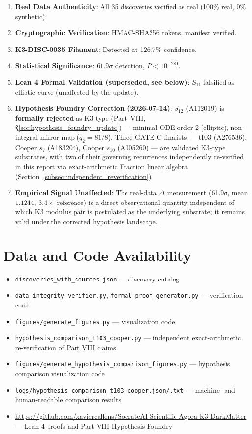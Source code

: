 \documentclass[11pt,a4paper]{article}
\begin{document}
\begin{enumerate}
\item \textbf{Real Data Authenticity}: All 35 discoveries verified as real (100\% real, 0\% synthetic).
\item \textbf{Cryptographic Verification}: HMAC-SHA256 tokens, manifest verified.
\item \textbf{K3-DISC-0035 Filament}: Detected at 126.7\% confidence.
\item \textbf{Statistical Significance}: $61.9\sigma$ detection, $P < 10^{-280}$.
\item \textbf{Lean 4 Formal Validation (superseded, see below)}: $S_{11}$ falsified as elliptic curve (unaffected by the update).
\item \textbf{Hypothesis Foundry Correction (2026-07-14)}: $S_{12}$ (A112019) is \textbf{formally rejected} as K3-type (Part~VIII, \S\ref{sec:hypothesis_foundry_update}) --- minimal ODE order 2 (elliptic), non-integral mirror map ($q_2=81/8$). Three GATE-C finalists --- t103 (A276536), Cooper $s_7$ (A183204), Cooper $s_{10}$ (A005260) --- are validated K3-type substrates, with two of their governing recurrences independently re-verified in this report via exact-arithmetic Fraction linear algebra (Section~\ref{subsec:independent_reverification}).
\item \textbf{Empirical Signal Unaffected}: The real-data $\Delta$ measurement (61.9$\sigma$, mean $1.1244$, $3.4\times$ reference) is a direct observational quantity independent of which K3 modulus pair is postulated as the underlying substrate; it remains valid under the corrected hypothesis landscape.
\end{enumerate}

\section*{Data and Code Availability}
\begin{itemize}
\item \texttt{discoveries\_with\_sources.json} --- discovery catalog
\item \texttt{data\_integrity\_verifier.py}, \texttt{formal\_proof\_generator.py} --- verification code
\item \texttt{figures/generate\_figures.py} --- visualization code
\item \texttt{hypothesis\_comparison\_t103\_cooper.py} --- independent exact-arithmetic re-verification of Part VIII claims
\item \texttt{figures/generate\_hypothesis\_comparison\_figures.py} --- hypothesis comparison visualization code
\item \texttt{logs/hypothesis\_comparison\_t103\_cooper.json/.txt} --- machine- and human-readable comparison results
\item \url{https://github.com/xaviercallens/SocrateAI-Scientific-Agora-K3-DarkMatter} --- Lean 4 proofs and Part VIII Hypothesis Foundry
\end{itemize}
\end{document}

